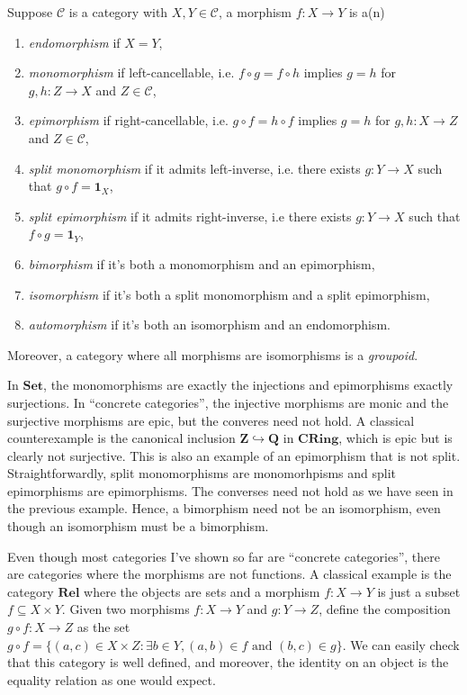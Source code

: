 \documentclass[11pt]{book}
\begin{document}
\begin{definition}Suppose $\mathcal C$ is a category with $X,Y\in\mathcal C$, a morphism $f:X\rightarrow Y$ is a(n)
\begin{enumerate}[label=(\roman*)]
	\item \textit{endomorphism} if $X=Y$,
	\item \textit{monomorphism} if left-cancellable, i.e. $f\circ g=f\circ h$ implies $g=h$ for $g,h:Z\rightarrow X$ and $Z\in\mathcal C$,
	\item \textit{epimorphism} if right-cancellable, i.e. $g\circ f=h\circ f$ implies $g=h$ for $g,h:X\rightarrow Z$ and $Z\in\mathcal C$,
	\item \textit{split monomorphism} if it admits left-inverse, i.e. there exists $g:Y\rightarrow X$ such that $g\circ f=\mathbf 1_X$,
	\item \textit{split epimorphism} if it admits right-inverse, i.e there exists $g:Y\rightarrow X$ such that $f\circ g=\mathbf 1_Y$,
	\item \textit{bimorphism} if it's both a monomorphism and an epimorphism,
	\item \textit{isomorphism} if it's both a split monomorphism and a split epimorphism,
	\item \textit{automorphism} if it's both an isomorphism and an endomorphism. 
\end{enumerate}
Moreover, a category where all morphisms are isomorphisms is a \textit{groupoid}. 
\end{definition}
In $\mathbf{Set}$, the monomorphisms are exactly the injections and epimorphisms exactly surjections. In ``concrete categories'', the injective morphisms are monic and the surjective morphisms are epic, but the converes need not hold. A classical counterexample is the canonical inclusion $\mathbf Z\hookrightarrow\mathbf Q$ in $\mathbf{CRing}$, which is epic but is clearly not surjective. This is also an example of an epimorphism that is not split. Straightforwardly, split monomorphisms are monomorhpisms and split epimorphisms are epimorphisms. The converses need not hold as we have seen in the previous example. Hence, a bimorphism need not be an isomorphism, even though an isomorphism must be a bimorphism. 

Even though most categories I've shown so far are ``concrete categories'', there are categories where the morphisms are not functions. A classical example is the category $\mathbf{Rel}$ where the objects are sets and a morphism $f:X\rightarrow Y$ is just a subset $f\subseteq X\times Y$. Given two morphisms $f:X\rightarrow Y$ and $g:Y\rightarrow Z$, define the composition $g\circ f:X\rightarrow Z$ as the set $g\circ f=\{(a,c)\in X\times Z:\exists b\in Y,(a,b)\in f\textrm{\ and\ }(b,c)\in g\}$. We can easily check that this category is well defined, and moreover, the identity on an object is the equality relation as one would expect.
\end{document}
